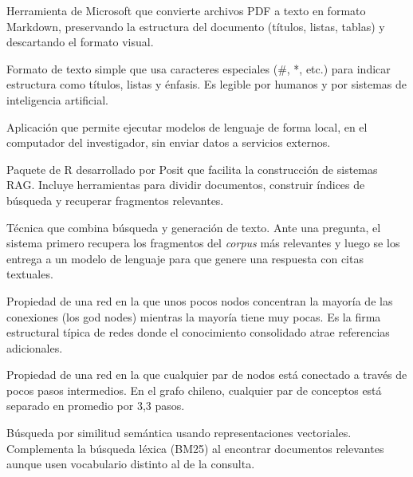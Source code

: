 \documentclass[12pt,a4paper]{article}
\begin{document}
\begin{description}[leftmargin=3.2cm, style=sameline, itemsep=6pt]
\item[MarkItDown] Herramienta de Microsoft que convierte archivos PDF a texto
en formato Markdown, preservando la estructura del documento (títulos, listas,
tablas) y descartando el formato visual.

\item[Markdown] Formato de texto simple que usa caracteres especiales (\#, *,
etc.) para indicar estructura como títulos, listas y énfasis. Es legible por
humanos y por sistemas de inteligencia artificial.

\item[Ollama] Aplicación que permite ejecutar modelos de lenguaje de forma
local, en el computador del investigador, sin enviar datos a servicios externos.

\item[ragnar] Paquete de R desarrollado por Posit que facilita la construcción
de sistemas RAG. Incluye herramientas para dividir documentos, construir índices
de búsqueda y recuperar fragmentos relevantes.

\item[RAG (\textit{Retrieval-Augmented Generation})] Técnica que combina búsqueda y
generación de texto. Ante una pregunta, el sistema primero recupera los
fragmentos del \textit{corpus} más relevantes y luego se los entrega a un modelo de
lenguaje para que genere una respuesta con citas textuales.

\item[\textit{scale-free}] Propiedad de una red en la que unos pocos nodos concentran
la mayoría de las conexiones (los god nodes) mientras la mayoría tiene muy pocas.
Es la firma estructural típica de redes donde el conocimiento consolidado atrae
referencias adicionales.

\item[\textit{small-world}] Propiedad de una red en la que cualquier par de nodos está
conectado a través de pocos pasos intermedios. En el grafo chileno, cualquier
par de conceptos está separado en promedio por 3{,}3 pasos.

\item[VSS (\textit{Vector Similarity Search})] Búsqueda por similitud semántica
usando representaciones vectoriales. Complementa la búsqueda léxica (BM25) al
encontrar documentos relevantes aunque usen vocabulario distinto al de la consulta.

\end{description}
\end{document}
